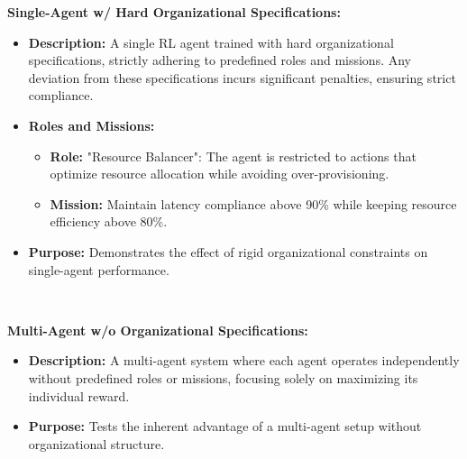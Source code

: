 \documentclass[conference]{IEEEtran}
\begin{document}
\noindent \textbf{Single-Agent w/ Hard Organizational Specifications:}
\begin{itemize}
    \item \textbf{Description:} A single RL agent trained with hard organizational specifications, strictly adhering to predefined roles and missions. Any deviation from these specifications incurs significant penalties, ensuring strict compliance.
    \item \textbf{Roles and Missions:}
    \begin{itemize}
        \item \textbf{Role:} "Resource Balancer": The agent is restricted to actions that optimize resource allocation while avoiding over-provisioning.
        \item \textbf{Mission:} Maintain latency compliance above 90\% while keeping resource efficiency above 80\%.
    \end{itemize}
    \item \textbf{Purpose:} Demonstrates the effect of rigid organizational constraints on single-agent performance.
\end{itemize}

\

\noindent \textbf{Multi-Agent w/o Organizational Specifications:}
\begin{itemize}
    \item \textbf{Description:} A multi-agent system where each agent operates independently without predefined roles or missions, focusing solely on maximizing its individual reward.
    \item \textbf{Purpose:} Tests the inherent advantage of a multi-agent setup without organizational structure.
\end{itemize}

\
\end{document}
